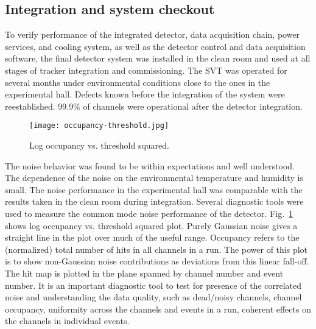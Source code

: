%
%

%

\subsection{Integration and system checkout}

To verify performance of the integrated detector, data acquisition chain, power services, and cooling system, as well as the detector control and data acquisition software, the final detector system was installed in the clean room and used at all stages of tracker integration and commissioning. The SVT was operated for several months under environmental conditions close to the ones in the experimental hall. Defects known before the integration of the system were reestablished. 99.9$\%$ of channels were operational after the detector integration. 
 
\begin{figure}[hbt] 
\centering 
\texttt{[image: occupancy-threshold.jpg]}
\caption{Log occupancy vs. threshold squared.}
\label{fig:occupancy-threshold}
\end{figure}

The noise behavior was found to be within expectations and well understood. The dependence of the noise on the environmental temperature and humidity is small. The noise performance in the experimental hall was comparable with the results taken in the clean room during integration. Several diagnostic tools were used to measure the common mode noise performance of the detector. Fig.~\ref{fig:occupancy-threshold} shows log occupancy vs. threshold squared plot. Purely Gaussian noise gives a straight line in the plot over much of the useful range. Occupancy refers to the (normalized) total number of hits in all channels in a run. The power of this plot is to show non-Gaussian noise contributions as deviations from this linear fall-off. The hit map is plotted in the plane spanned by channel number and event number. It is an important diagnostic tool to test for presence of the correlated noise and understanding the data quality, such as dead/noisy channels, channel occupancy, uniformity across the channels and events in a run, coherent effects on the channels in individual events.

